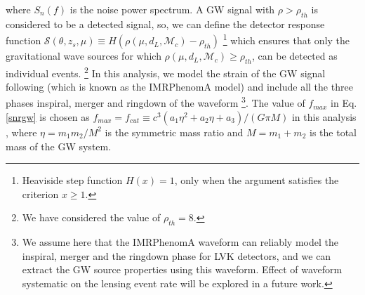 \documentclass[a4paper,useAMS,usenatbib]{mnras}
\begin{document}
where $S_n(f)$ is the noise power spectrum. A GW signal with $\rho>\rho_{th}$ is considered to be a detected signal, so, we can define the detector response function $\mathcal{S}(\theta,z_s, \mu)\equiv H (\rho (\mu, d_L, \mathcal{M}_c)-\rho_{th})$ \footnote{Heaviside step function $H(x)=1$, only when the argument satisfies the criterion $x\geq 1$.} which ensures that only the gravitational wave sources for which $\rho (\mu, d_L, \mathcal{M}_c) \geq \rho_{th}$, can be detected as individual events. \footnote{We have considered the value of $\rho_{th}=8$.}  {In this analysis, we model the strain of the GW signal following \citep{Ajith:2007kx} (which is  known as the IMRPhenomA model})  {and include all the three phases inspiral, merger and ringdown of the waveform \footnote{ {We assume here that the IMRPhenomA waveform can reliably model the inspiral, merger and the ringdown phase for LVK detectors, and we can extract the GW source properties using this waveform. Effect of waveform systematic on the lensing event rate will be explored in a future work.}}. The value of $f_{max}$ in Eq. \eqref{snrgw} is chosen  as $f_{max}= f_{cut}\equiv c^3(a_1\eta^2+a_2\eta+a_3) /(G\pi M)$ in this analysis \citep{Ajith:2007kx},} where $\eta= m_1m_2/M^2$ is the symmetric mass ratio and $M=m_1+m_2$ is the total mass of the GW system.  
\end{document}
